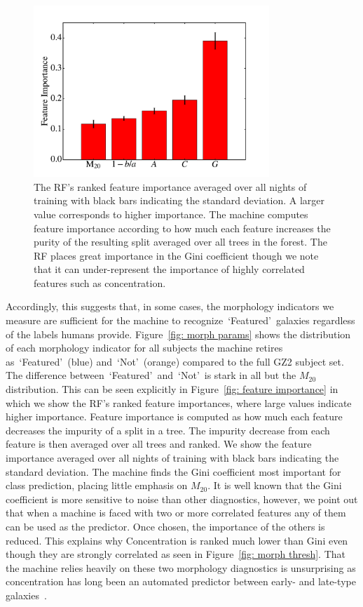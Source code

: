 \documentclass[twocolumn,  trackchanges,]{aastex6}%
\newcommand{\M}[1]{$M_{\mathrm{#1}}$}
\newcommand{\feat}{`Featured'}
\newcommand{\notfeat}{`Not'}
\begin{document}
\begin{figure}[t]
\includegraphics[width=3.5in]{f11.pdf}
\caption{The RF's ranked feature importance averaged over all nights of training with black bars indicating the standard deviation. A larger value corresponds to higher importance. The machine computes feature importance according to how much each feature increases the purity of the resulting split averaged over all trees in the forest. The RF places great importance in the Gini coefficient though we note that it can under-represent the importance of highly correlated features such as concentration.\label{fig: feature importance}}
\end{figure}

Accordingly, this suggests that, in some cases, the morphology indicators we measure are 
sufficient for the machine to recognize~\feat~galaxies regardless of the labels humans provide. 
Figure~\ref{fig: morph params} shows the distribution of each 
morphology indicator for all subjects the machine retires as~\feat~(blue) 
and~\notfeat~(orange) compared to the full GZ2 subject set. 
The difference between~\feat~and~\notfeat~is stark in all but the \M{20} distribution. 
This can be seen explicitly in Figure~\ref{fig:  feature importance} in which
we show the RF's ranked feature importances, where large values indicate higher importance. 
Feature importance is computed as how much each feature decreases the impurity 
of a split in a tree. The impurity decrease from each feature is then averaged over
all trees and ranked. 
We show the feature importance averaged over all nights of training with 
black bars indicating the standard deviation. The machine finds the Gini coefficient 
most important for class prediction, placing little emphasis on \M{20}. 
It is well known that the Gini coefficient is more sensitive to noise than other diagnostics, 
however, we point out that when a machine is faced with two or more correlated features 
any of them can be used as the predictor. Once chosen, the importance of the others is reduced. 
This explains why Concentration is ranked much lower than Gini even though they 
are strongly correlated as seen in Figure~\ref{fig: morph thresh}. 
That the machine relies heavily on these two morphology diagnostics is unsurprising as
concentration has long been an automated predictor between early- and late-type galaxies~\citep{Abraham1994, Abraham1996, Shen2003}.
\end{document}
